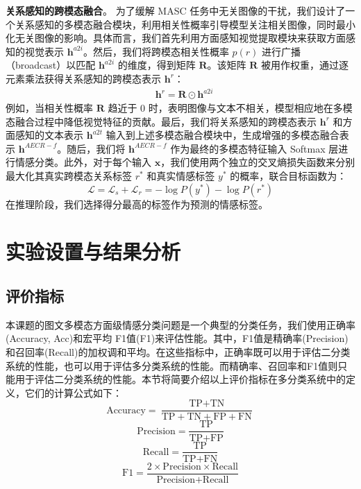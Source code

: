 \textbf{关系感知的跨模态融合}。 为了缓解 MASC 任务中无关图像的干扰，我们设计了一个关系感知的多模态融合模块，利用相关性概率引导模型关注相关图像，同时最小化无关图像的影响。具体而言，我们首先利用方面感知视觉提取模块来获取方面感知的视觉表示 $\mathbf{h}^{a2i}$。然后，我们将跨模态相关性概率 $p(r)$ 进行广播（broadcast）以匹配 $\mathbf{h}^{a2i}$ 的维度，得到矩阵 $\mathbf{R}$。该矩阵 $\mathbf{R}$ 被用作权重，通过逐元素乘法获得关系感知的跨模态表示 $\mathbf{h}^r$：
\begin{equation}
 \begin{split}
     & \mathbf{h}^r= \mathbf{R} \odot \mathbf{h}^{a2i}
 \end{split}
\end{equation}
例如，当相关性概率 $\mathbf{R}$ 趋近于 0 时，表明图像与文本不相关，模型相应地在多模态融合过程中降低视觉特征的贡献。最后，我们将关系感知的跨模态表示 $\mathbf{h}^r$ 和方面感知的文本表示 $\mathbf{h}^{a2t}$ 输入到上述多模态融合模块中，生成增强的多模态融合表示 $\mathbf{h}^{AECR-f}$。随后，我们将 $\mathbf{h}^{AECR-f}$ 作为最终的多模态特征输入 Softmax 层进行情感分类。此外，对于每个输入 $\mathbf{x}$，我们使用两个独立的交叉熵损失函数来分别最大化其真实跨模态关系标签 $r^*$ 和真实情感标签 $y^*$ 的概率，联合目标函数为：
\begin{equation}
    \mathcal{L} = \mathcal{L}_{s}+\mathcal{L}_{r}=-\log P(y^*)-\log P(r^*)
\end{equation}
在推理阶段，我们选择得分最高的标签作为预测的情感标签。


\section{实验设置与结果分析}

\subsection{评价指标}
本课题的图文多模态方面级情感分类问题是一个典型的分类任务，我们使用正确率(Accuracy, Acc)和宏平均 F1值(F1)来评估性能。其中，F1值是精确率(Precision)和召回率(Recall)的加权调和平均。在这些指标中，正确率既可以用于评估二分类系统的性能，也可以用于评估多分类系统的性能。而精确率、召回率和F1值则只能用于评估二分类系统的性能。本节将简要介绍以上评价指标在多分类系统中的定义，它们的计算公式如下： 
\begin{equation}
\text{Accuracy} = \frac{\text{TP} + \text{TN}}{\text{TP} + \text{TN} + \text{FP} + \text{FN}}
\end{equation}
\begin{equation}
\text{Precision} = \frac{\text{TP}}{\text{TP} + \text{FP}}
\end{equation}
\begin{equation}
\text{Recall} = \frac{\text{TP}}{\text{TP} + \text{FN}}
\end{equation}
\begin{equation}
\text{F1} = \frac{2 \times \text{Precision} \times \text{Recall}}{\text{Precision} + \text{Recall}}
\end{equation}

